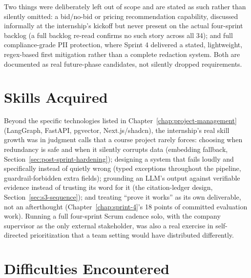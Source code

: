 \documentclass[12pt,a4paper]{report}
\begin{document}
Two things were deliberately left out of scope and are stated as such
rather than silently omitted: a bid/no-bid or pricing recommendation
capability, discussed informally at the internship's kickoff but never
present on the actual four-sprint backlog (a full backlog re-read
confirms no such story across all 34); and full compliance-grade PII
protection, where Sprint 4 delivered a stated, lightweight, regex-based
first mitigation rather than a complete redaction system. Both are
documented as real future-phase candidates, not silently dropped
requirements.

\section*{Skills Acquired}


Beyond the specific technologies listed in Chapter~\ref{chap:project-management}
(LangGraph, FastAPI, pgvector, Next.js/shadcn), the internship's real
skill growth was in judgment calls that a course project rarely forces:
choosing when redundancy is safe and when it silently corrupts data
(embedding fallback, Section~\ref{sec:post-sprint-hardening}); designing a system
that fails loudly and specifically instead of quietly wrong
(typed exceptions throughout the pipeline, guardrail-forbidden extra
fields); grounding an LLM's output against verifiable evidence instead of
trusting its word for it (the citation-ledger design,
Section~\ref{sec:s3-sequence}); and treating ``prove it works'' as its own
deliverable, not an afterthought (Chapter~\ref{chap:sprint-4}'s 18 points
of committed evaluation work). Running a full four-sprint Scrum cadence
solo, with the company supervisor as the only external stakeholder, was
also a real exercise in self-directed prioritization that a team setting
would have distributed differently.

\section*{Difficulties Encountered}
\end{document}
